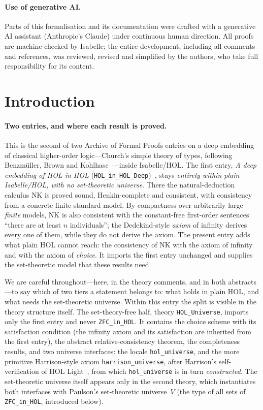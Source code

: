 \documentclass[11pt,a4paper]{article}
\begin{document}
\paragraph{Use of generative AI.}
Parts of this formalisation and its documentation were drafted with a
generative AI assistant (Anthropic's Claude) under continuous human
direction.  All proofs are machine-checked by Isabelle; the entire
development, including all comments and references, was reviewed, revised
and simplified by the authors, who take full responsibility for its content.

\setcounter{tocdepth}{1}
\tableofcontents
\newpage

\section{Introduction}

\paragraph{Two entries, and where each result is proved.}
This is the second of two Archive of Formal Proofs entries on a deep
embedding of classical higher-order logic---Church's simple theory of
types, following Benzm\"uller, Brown and Kohlhase~\cite{BBK04}---inside
Isabelle/HOL.  The first entry, \emph{A deep embedding of HOL in HOL}
(\texttt{HOL\_in\_HOL\_Deep})~\cite{HOLinHOLDeep}, stays \emph{entirely
within plain Isabelle/HOL, with no set-theoretic universe}.  There the
natural-deduction calculus $\mathrm{NK}$ is proved sound, Henkin-complete
and consistent, with consistency from a concrete finite standard model.
By compactness over arbitrarily large \emph{finite} models, $\mathrm{NK}$
is also consistent with the constant-free first-order sentences ``there
are at least $n$ individuals''; the Dedekind-style \emph{axiom} of
infinity derives every one of them, while they do not derive the axiom.  The present entry adds what plain HOL cannot reach:
the consistency of $\mathrm{NK}$ with the axiom of infinity and with the
axiom of \emph{choice}.  It imports the
first entry unchanged and supplies the set-theoretic model that these
results need.

We are careful throughout---here, in the theory comments, and in both
abstracts---to say which of two tiers a statement belongs to: what holds in
plain HOL, and what needs the set-theoretic universe.  Within this entry the
split is visible in the theory structure itself.  The set-theory-free half,
theory \texttt{HOL\_Universe}, imports only the first entry and never
\texttt{ZFC\_in\_HOL}.  It contains the choice scheme with its satisfaction
condition (the infinity axiom and its satisfaction are inherited from the
first entry), the abstract relative-consistency theorem, the completeness
results, and two universe interfaces: the locale \texttt{hol\_universe}, and
the more primitive Harrison-style axiom \texttt{harrison\_universe}, after
Harrison's self-verification of HOL Light~\cite{Harrison06}, from which
\texttt{hol\_universe} is in turn \emph{constructed}.  The set-theoretic
universe itself appears only in the second theory, which instantiates both
interfaces with Paulson's set-theoretic universe~$V$ (the type of all sets of
\texttt{ZFC\_in\_HOL}, introduced below).
\end{document}
